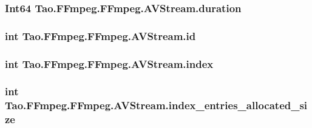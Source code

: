 \label{struct_tao_1_1_f_fmpeg_1_1_f_fmpeg_1_1_a_v_stream_aa94077cccff548456956cee7de239c1e}
\hypertarget{struct_tao_1_1_f_fmpeg_1_1_f_fmpeg_1_1_a_v_stream_a8b84a21c3b456d4721ce8ff1dc6ab587}{
\subsubsection[{duration}]{\setlength{\rightskip}{0pt plus 5cm}Int64 {\bf Tao.FFmpeg.FFmpeg.AVStream.duration}}}
\label{struct_tao_1_1_f_fmpeg_1_1_f_fmpeg_1_1_a_v_stream_a8b84a21c3b456d4721ce8ff1dc6ab587}
\hypertarget{struct_tao_1_1_f_fmpeg_1_1_f_fmpeg_1_1_a_v_stream_a325d940a93ae615761dc5d14dfee15ee}{
\subsubsection[{id}]{\setlength{\rightskip}{0pt plus 5cm}int {\bf Tao.FFmpeg.FFmpeg.AVStream.id}}}
\label{struct_tao_1_1_f_fmpeg_1_1_f_fmpeg_1_1_a_v_stream_a325d940a93ae615761dc5d14dfee15ee}
\hypertarget{struct_tao_1_1_f_fmpeg_1_1_f_fmpeg_1_1_a_v_stream_aefa59f90785cdcb018a21bf7845dc223}{
\subsubsection[{index}]{\setlength{\rightskip}{0pt plus 5cm}int {\bf Tao.FFmpeg.FFmpeg.AVStream.index}}}
\label{struct_tao_1_1_f_fmpeg_1_1_f_fmpeg_1_1_a_v_stream_aefa59f90785cdcb018a21bf7845dc223}
\hypertarget{struct_tao_1_1_f_fmpeg_1_1_f_fmpeg_1_1_a_v_stream_a3fa03add7e0877ff5494192551d25e9b}{
\subsubsection[{index\_\-entries\_\-allocated\_\-size}]{\setlength{\rightskip}{0pt plus 5cm}int {\bf Tao.FFmpeg.FFmpeg.AVStream.index\_\-entries\_\-allocated\_\-size}}}
